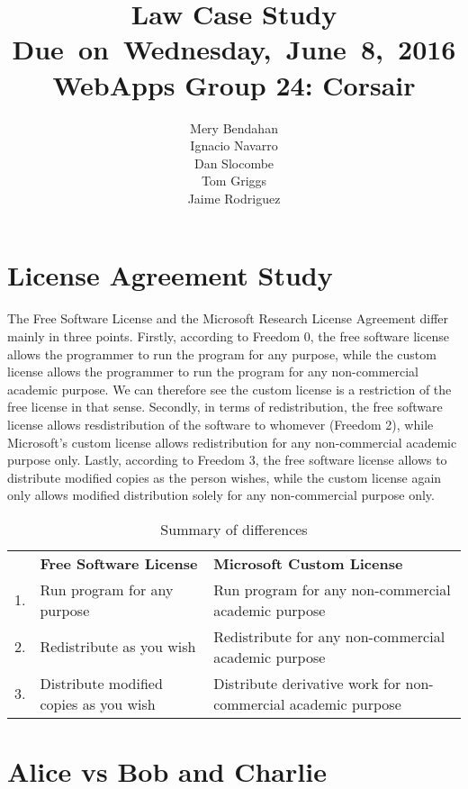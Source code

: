\documentclass{article}
\title{
\vspace{2in}
\textmd{\textbf{Law Case Study}}\\
\normalsize\vspace{0.1in}\small{Due\ on\ Wednesday,\ June\ 8,\ 2016}\\
\vspace{0.1in}\large{\textbf{WebApps Group 24: Corsair}}
\vspace{3in}
}
\author{Mery Bendahan \\ Ignacio Navarro \\ Dan Slocombe \\ Tom Griggs \\ Jaime Rodriguez}
\date{}
\renewcommand{\_}{\char`_}
\begin{document}
\maketitle
\newpage

\section{License Agreement Study}

The Free Software License and the Microsoft Research License Agreement differ mainly in three points. Firstly, according to Freedom 0,  the free software license allows the programmer to run the program for any purpose, while the custom license allows the programmer to run the program for any non-commercial academic purpose. We can therefore see the custom license is a restriction of the free license in that sense. Secondly, in terms of redistribution, the free software license allows resdistribution of the software to whomever (Freedom 2), while Microsoft's custom license allows redistribution for any non-commercial academic purpose only. Lastly, according to Freedom 3, the free software license allows to distribute modified copies as the person wishes, while the custom license again only allows modified distribution solely for any non-commercial purpose only.

\begin{table}[H]
\centering
\caption{Summary of differences}
\label{my-label}
\begin{tabular}{l|l|l|}
\cline{2-3}
   & \textbf{Free Software License}         & \textbf{Microsoft Custom License}                              \\ \cline{2-3} 
1. & Run program for any purpose            & Run program for any non-commercial academic purpose            \\ \cline{2-3} 
2. & Redistribute as you wish               & Redistribute for any non-commercial academic purpose           \\ \cline{2-3} 
3. & Distribute modified copies as you wish & Distribute derivative work for non-commercial academic purpose \\ \cline{2-3} 
\end{tabular}
\end{table}

\section{Alice vs Bob and Charlie}
\end{document}
